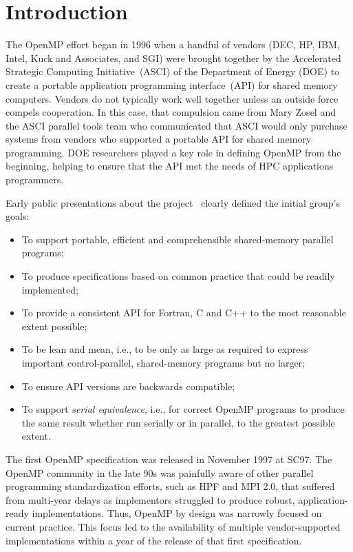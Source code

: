 \section{Introduction}
\label{sec:intro}

The OpenMP effort began in 1996 when a handful of vendors (DEC, HP, IBM, 
Intel, Kuck and Associates, and SGI) were brought together by the Accelerated 
Strategic Computing Initiative~(ASCI) of the Department of Energy (DOE) to 
create a portable application programming interface~(API) for shared memory 
computers. Vendors do not typically work well together unless an outside 
force compels cooperation. In this case, that compulsion came from Mary 
Zosel and the ASCI parallel tools team who communicated that ASCI would 
only purchase systems from vendors who supported a portable API for shared 
memory programming. DOE researchers played a key role in defining OpenMP 
from the beginning, helping to ensure that the API met the needs of HPC 
applications programmers.

Early public presentations about the project~\cite{ewomp99} clearly
defined the initial group's goals:

\begin{itemize}
  \item To support portable, efficient and comprehensible shared-memory 
        parallel programs;
  \item To produce specifications based on common practice that 
        could be readily implemented;
  \item To provide a consistent API for Fortran, C and C++ to the 
        most reasonable extent possible;
  \item To be lean and mean, i.e., to  be only as large as required 
        to express important control-parallel, shared-memory programs  
        but no larger;
  \item To ensure API versions are backwards compatible;
  \item To support \emph{serial equivalence}, i.e., for correct OpenMP 
        programs to produce the same result whether run serially or in
        parallel, to the greatest possible extent.
\end{itemize}

The first OpenMP specification  was released in November 1997 at SC97. The
OpenMP community in the late 90s was painfully aware of other parallel
programming  standardization efforts, such as HPF and MPI 2.0, that
suffered from multi-year delays as implementors struggled to produce robust,
application-ready implementations. Thus, OpenMP by design was narrowly
focused on current practice. This focus led to the availability of multiple
vendor-supported implementations within a year of the release of that 
first specification. 

